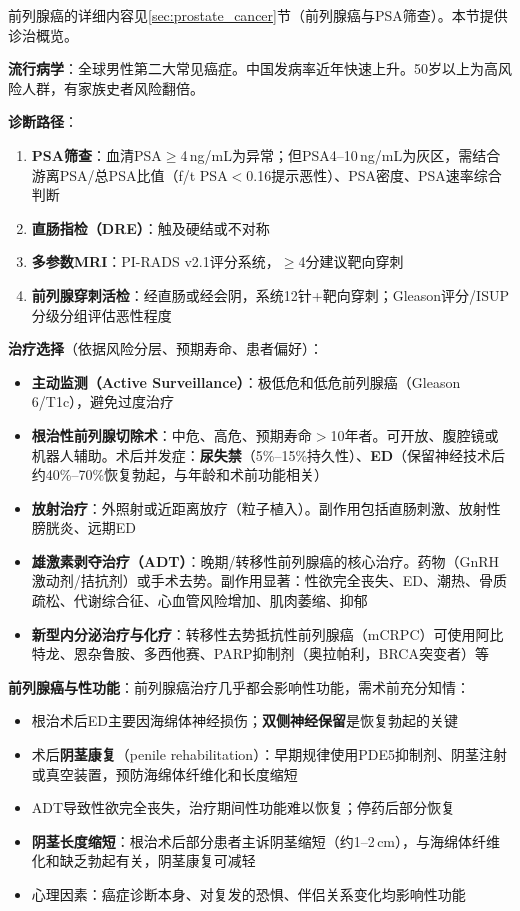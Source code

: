 前列腺癌的详细内容见\ref{sec:prostate_cancer}节（前列腺癌与PSA筛查）。本节提供诊治概览。

\textbf{流行病学}：全球男性第二大常见癌症。中国发病率近年快速上升。50岁以上为高风险人群，有家族史者风险翻倍。

\textbf{诊断路径}：
\begin{enumerate}
	\item \textbf{PSA筛查}：血清PSA$\ge$4\,ng/mL为异常；但PSA4--10\,ng/mL为灰区，需结合游离PSA/总PSA比值（f/t PSA$<$0.16提示恶性）、PSA密度、PSA速率综合判断
	\item \textbf{直肠指检（DRE）}：触及硬结或不对称
	\item \textbf{多参数MRI}：PI-RADS v2.1评分系统，$\ge$4分建议靶向穿刺
	\item \textbf{前列腺穿刺活检}：经直肠或经会阴，系统12针+靶向穿刺；Gleason评分/ISUP分级分组评估恶性程度
\end{enumerate}

\textbf{治疗选择}（依据风险分层、预期寿命、患者偏好）：
\begin{itemize}[leftmargin=2cm]
	\item \textbf{主动监测（Active Surveillance）}：极低危和低危前列腺癌（Gleason 6/T1c），避免过度治疗
	\item \textbf{根治性前列腺切除术}：中危、高危、预期寿命$>$10年者。可开放、腹腔镜或机器人辅助。术后并发症：\textbf{尿失禁}（5\%--15\%持久性）、\textbf{ED}（保留神经技术后约40\%--70\%恢复勃起，与年龄和术前功能相关）
	\item \textbf{放射治疗}：外照射或近距离放疗（粒子植入）。副作用包括直肠刺激、放射性膀胱炎、远期ED
	\item \textbf{雄激素剥夺治疗（ADT）}：晚期/转移性前列腺癌的核心治疗。药物（GnRH激动剂/拮抗剂）或手术去势。副作用显著：性欲完全丧失、ED、潮热、骨质疏松、代谢综合征、心血管风险增加、肌肉萎缩、抑郁
	\item \textbf{新型内分泌治疗与化疗}：转移性去势抵抗性前列腺癌（mCRPC）可使用阿比特龙、恩杂鲁胺、多西他赛、PARP抑制剂（奥拉帕利，BRCA突变者）等
\end{itemize}

\textbf{前列腺癌与性功能}：前列腺癌治疗几乎都会影响性功能，需术前充分知情：
\begin{itemize}[leftmargin=2cm]
	\item 根治术后ED主要因海绵体神经损伤；\textbf{双侧神经保留}是恢复勃起的关键
	\item 术后\textbf{阴茎康复}（penile rehabilitation）：早期规律使用PDE5抑制剂、阴茎注射或真空装置，预防海绵体纤维化和长度缩短
	\item ADT导致性欲完全丧失，治疗期间性功能难以恢复；停药后部分恢复
	\item \textbf{阴茎长度缩短}：根治术后部分患者主诉阴茎缩短（约1--2\,cm），与海绵体纤维化和缺乏勃起有关，阴茎康复可减轻
	\item 心理因素：癌症诊断本身、对复发的恐惧、伴侣关系变化均影响性功能
\end{itemize}

